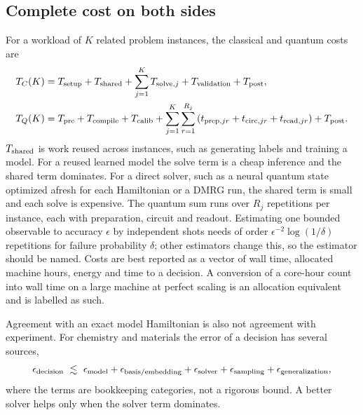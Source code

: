 \documentclass[10pt,a4paper]{article}
\begin{document}
\subsection{Complete cost on both sides}
\label{sec:cost}
For a workload of $K$ related problem instances, the classical and quantum costs are
\begin{align}
T_C(K) &= T_{\rm setup}+T_{\rm shared}+\sum_{j=1}^{K}T_{{\rm solve},j}+T_{\rm validation}+T_{\rm post},\label{eq:tck}\\
T_Q(K) &= T_{\rm pre}+T_{\rm compile}+T_{\rm calib}+\sum_{j=1}^{K}\sum_{r=1}^{R_j}\left(t_{{\rm prep},jr}+t_{{\rm circ},jr}+t_{{\rm read},jr}\right)+T_{\rm post}.\label{eq:tqk}
\end{align}
$T_{\rm shared}$ is work reused across instances, such as generating labels and training a model. For a reused learned model the solve term is a cheap inference and the shared term dominates. For a direct solver, such as a neural quantum state optimized afresh for each Hamiltonian or a DMRG run, the shared term is small and each solve is expensive. The quantum sum runs over $R_j$ repetitions per instance, each with preparation, circuit and readout. Estimating one bounded observable to accuracy $\epsilon$ by independent shots needs of order $\epsilon^{-2}\log(1/\delta)$ repetitions for failure probability $\delta$; other estimators change this, so the estimator should be named. Costs are best reported as a vector of wall time, allocated machine hours, energy and time to a decision. A conversion of a core-hour count into wall time on a large machine at perfect scaling is an allocation equivalent and is labelled as such.

Agreement with an exact model Hamiltonian is also not agreement with experiment. For chemistry and materials the error of a decision has several sources,
\begin{equation}
\epsilon_{\rm decision}\ \lesssim\ \epsilon_{\rm model}+\epsilon_{\rm basis/embedding}+\epsilon_{\rm solver}+\epsilon_{\rm sampling}+\epsilon_{\rm generalization},
\label{eq:errbudget}
\end{equation}
where the terms are bookkeeping categories, not a rigorous bound. A better solver helps only when the solver term dominates.
\end{document}
